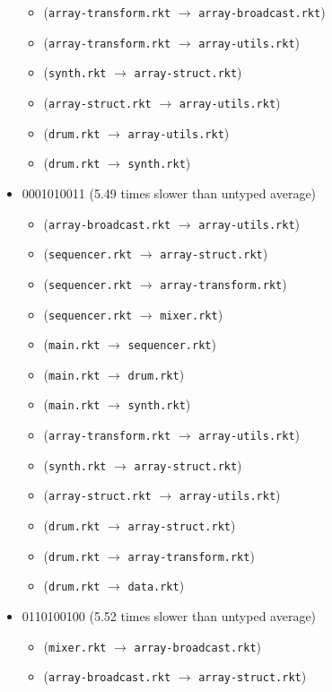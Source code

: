 \documentclass{article}
\newcommand{\mono}[1]{\texttt{#1}}
\begin{document}
\begin{itemize}
\begin{itemize}
  \item (\mono{array-transform.rkt} $\rightarrow$ \mono{array-broadcast.rkt})
  \item (\mono{array-transform.rkt} $\rightarrow$ \mono{array-utils.rkt})
  \item (\mono{synth.rkt} $\rightarrow$ \mono{array-struct.rkt})
  \item (\mono{array-struct.rkt} $\rightarrow$ \mono{array-utils.rkt})
  \item (\mono{drum.rkt} $\rightarrow$ \mono{array-utils.rkt})
  \item (\mono{drum.rkt} $\rightarrow$ \mono{synth.rkt})
  \end{itemize}
\item 0001010011 (5.49 times slower than untyped average)
  \begin{itemize}
  \item (\mono{array-broadcast.rkt} $\rightarrow$ \mono{array-utils.rkt})
  \item (\mono{sequencer.rkt} $\rightarrow$ \mono{array-struct.rkt})
  \item (\mono{sequencer.rkt} $\rightarrow$ \mono{array-transform.rkt})
  \item (\mono{sequencer.rkt} $\rightarrow$ \mono{mixer.rkt})
  \item (\mono{main.rkt} $\rightarrow$ \mono{sequencer.rkt})
  \item (\mono{main.rkt} $\rightarrow$ \mono{drum.rkt})
  \item (\mono{main.rkt} $\rightarrow$ \mono{synth.rkt})
  \item (\mono{array-transform.rkt} $\rightarrow$ \mono{array-utils.rkt})
  \item (\mono{synth.rkt} $\rightarrow$ \mono{array-struct.rkt})
  \item (\mono{array-struct.rkt} $\rightarrow$ \mono{array-utils.rkt})
  \item (\mono{drum.rkt} $\rightarrow$ \mono{array-struct.rkt})
  \item (\mono{drum.rkt} $\rightarrow$ \mono{array-transform.rkt})
  \item (\mono{drum.rkt} $\rightarrow$ \mono{data.rkt})
  \end{itemize}
\item 0110100100 (5.52 times slower than untyped average)
  \begin{itemize}
  \item (\mono{mixer.rkt} $\rightarrow$ \mono{array-broadcast.rkt})
  \item (\mono{array-broadcast.rkt} $\rightarrow$ \mono{array-struct.rkt})

\end{itemize}
\end{itemize}
\end{document}

